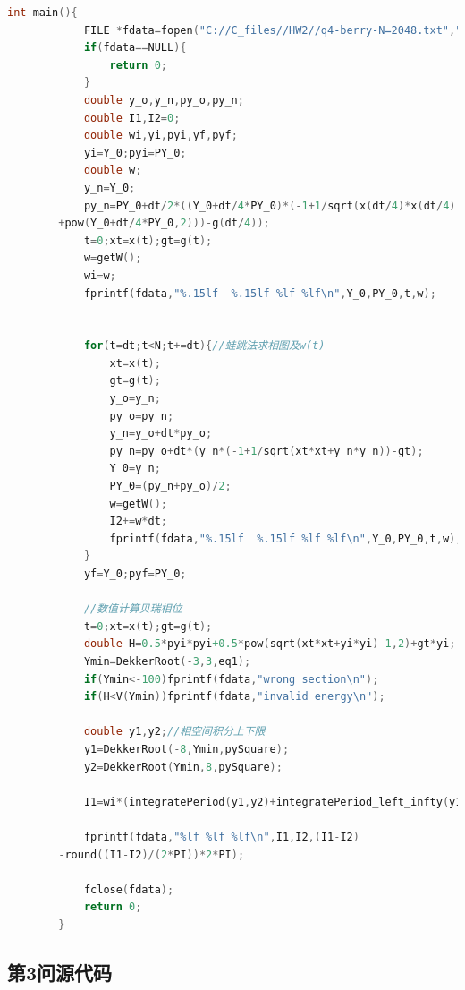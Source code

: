 \documentclass[10pt, a4paper]{article}
\begin{document}
\begin{lstlisting}[language=C]
        int main(){
            FILE *fdata=fopen("C://C_files//HW2//q4-berry-N=2048.txt","w");
            if(fdata==NULL){
                return 0;
            }
            double y_o,y_n,py_o,py_n;
            double I1,I2=0;
            double wi,yi,pyi,yf,pyf;
            yi=Y_0;pyi=PY_0;
            double w;
            y_n=Y_0;
            py_n=PY_0+dt/2*((Y_0+dt/4*PY_0)*(-1+1/sqrt(x(dt/4)*x(dt/4)
        +pow(Y_0+dt/4*PY_0,2)))-g(dt/4));
            t=0;xt=x(t);gt=g(t);
            w=getW();
            wi=w;
            fprintf(fdata,"%.15lf  %.15lf %lf %lf\n",Y_0,PY_0,t,w);
            
            
            for(t=dt;t<N;t+=dt){//蛙跳法求相图及w(t)
                xt=x(t);
                gt=g(t);
                y_o=y_n;
                py_o=py_n;
                y_n=y_o+dt*py_o;
                py_n=py_o+dt*(y_n*(-1+1/sqrt(xt*xt+y_n*y_n))-gt);
                Y_0=y_n;
                PY_0=(py_n+py_o)/2;
                w=getW();
                I2+=w*dt;
                fprintf(fdata,"%.15lf  %.15lf %lf %lf\n",Y_0,PY_0,t,w);
            }
            yf=Y_0;pyf=PY_0;
            
            //数值计算贝瑞相位
            t=0;xt=x(t);gt=g(t);
            double H=0.5*pyi*pyi+0.5*pow(sqrt(xt*xt+yi*yi)-1,2)+gt*yi;
            Ymin=DekkerRoot(-3,3,eq1);
            if(Ymin<-100)fprintf(fdata,"wrong section\n");
            if(H<V(Ymin))fprintf(fdata,"invalid energy\n");

            double y1,y2;//相空间积分上下限
            y1=DekkerRoot(-8,Ymin,pySquare);
            y2=DekkerRoot(Ymin,8,pySquare);

            I1=wi*(integratePeriod(y1,y2)+integratePeriod_left_infty(y1,y2,yf));

            fprintf(fdata,"%lf %lf %lf\n",I1,I2,(I1-I2)
        -round((I1-I2)/(2*PI))*2*PI);

            fclose(fdata);
            return 0;
        }

    \end{lstlisting}

    \subsection{第3问源代码}
    
\end{document}
